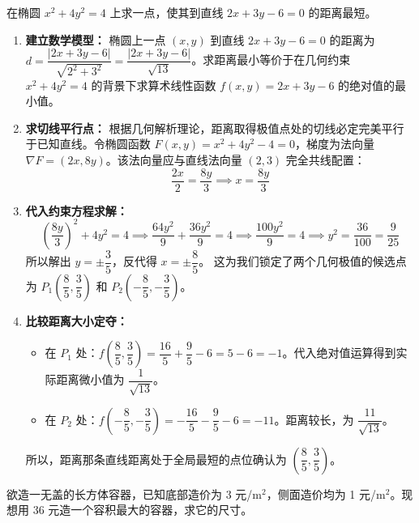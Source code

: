 \documentclass[lang=cn,11pt]{elegantbook}
\begin{document}
\begin{exercise}[距离最小化]
在椭圆 $x^2+4y^2=4$ 上求一点，使其到直线 $2x+3y-6=0$ 的距离最短。
\end{exercise}

\begin{solution}
\begin{enumerate}
    \item \textbf{建立数学模型：}
    椭圆上一点 $(x,y)$ 到直线 $2x+3y-6=0$ 的距离为 $d = \dfrac{|2x+3y-6|}{\sqrt{2^2+3^2}} = \dfrac{|2x+3y-6|}{\sqrt{13}}$。求距离最小等价于在几何约束 $x^2+4y^2=4$ 的背景下求算术线性函数 $f(x,y) = 2x+3y-6$ 的绝对值的最小值。
    
    \item \textbf{求切线平行点：}
    根据几何解析理论，距离取得极值点处的切线必定完美平行于已知直线。令椭圆函数 $F(x,y) = x^2+4y^2-4=0$，梯度为法向量 $\nabla F = (2x, 8y)$。该法向量应与直线法向量 $(2,3)$ 完全共线配置：
    \[
    \frac{2x}{2} = \frac{8y}{3} \implies x = \frac{8y}{3}
    \]
    
    \item \textbf{代入约束方程求解：}
    \[
    \left(\frac{8y}{3}\right)^2 + 4y^2 = 4 \implies \frac{64y^2}{9} + \frac{36y^2}{9} = 4 \implies \frac{100y^2}{9} = 4 \implies y^2 = \frac{36}{100} = \frac{9}{25}
    \]
    所以解出 $y = \pm \dfrac{3}{5}$，反代得 $x = \pm \dfrac{8}{5}$。
    这为我们锁定了两个几何极值的候选点为 $P_1\left(\dfrac{8}{5}, \dfrac{3}{5}\right)$ 和 $P_2\left(-\dfrac{8}{5}, -\dfrac{3}{5}\right)$。
    
    \item \textbf{比较距离大小定夺：}
    \begin{itemize}
        \item 在 $P_1$ 处：$f\left(\dfrac{8}{5}, \dfrac{3}{5}\right) = \dfrac{16}{5} + \dfrac{9}{5} - 6 = 5 - 6 = -1$。代入绝对值运算得到实际距离微小值为 $\dfrac{1}{\sqrt{13}}$。
        \item 在 $P_2$ 处：$f\left(-\dfrac{8}{5}, -\dfrac{3}{5}\right) = -\dfrac{16}{5} - \dfrac{9}{5} - 6 = -11$。距离较长，为 $\dfrac{11}{\sqrt{13}}$。
    \end{itemize}
    所以，距离那条直线距离处于全局最短的点位确认为 \textbf{$\left(\dfrac{8}{5}, \dfrac{3}{5}\right)$}。
\end{enumerate}
\end{solution}

\begin{exercise}[成本极值]
欲造一无盖的长方体容器，已知底部造价为 3 元/$\mathrm{m}^2$，侧面造价均为 1 元/$\mathrm{m}^2$。现想用 36 元造一个容积最大的容器，求它的尺寸。
\end{exercise}
\end{document}
